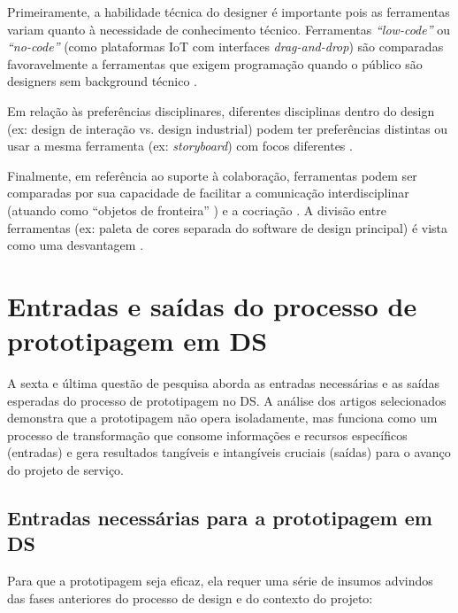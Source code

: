 Primeiramente, a habilidade técnica do designer é importante pois as ferramentas variam quanto à necessidade de conhecimento técnico. Ferramentas \textit{``low-code''} ou \textit{``no-code''} (como plataformas IoT com interfaces \textit{drag-and-drop}) são comparadas favoravelmente a ferramentas que exigem programação quando o público são designers sem background técnico \cite{Kim2024}.

Em relação às preferências disciplinares, diferentes disciplinas dentro do design (ex: design de interação vs. design industrial) podem ter preferências distintas ou usar a mesma ferramenta (ex: \textit{storyboard}) com focos diferentes \cite{wang2023smartproducts}.

Finalmente, em referência ao suporte à colaboração, ferramentas podem ser comparadas por sua capacidade de facilitar a comunicação interdisciplinar (atuando como ``objetos de fronteira'' \cite{paust2025integrative}) e a cocriação \cite{soto2023prototyping}. A divisão entre ferramentas (ex: paleta de cores separada do software de design principal) é vista como uma desvantagem \cite{hegemann2024palette}.



\section{Entradas e saídas do processo de prototipagem em DS}

A sexta e última questão de pesquisa aborda as entradas necessárias e as saídas esperadas do processo de prototipagem no DS. A análise dos artigos selecionados demonstra que a prototipagem não opera isoladamente, mas funciona como um processo de transformação que consome informações e recursos específicos (entradas) e gera resultados tangíveis e intangíveis cruciais (saídas) para o avanço do projeto de serviço.

\subsection{Entradas necessárias para a prototipagem em DS}

Para que a prototipagem seja eficaz, ela requer uma série de insumos advindos das fases anteriores do processo de design e do contexto do projeto:

